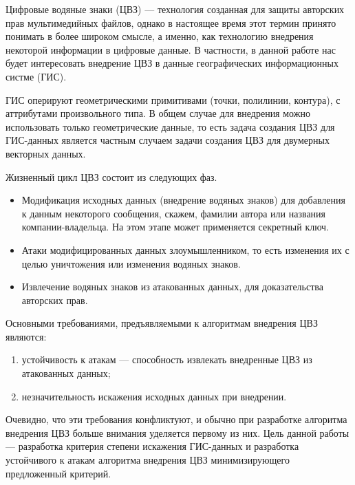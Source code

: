 \startprefacepage

Цифровые водяные знаки (ЦВЗ) --- технология созданная для защиты авторских прав мультимедийных файлов,
однако в настоящее время этот термин принято понимать в более широком смысле, а именно, как технологию
внедрения некоторой информации в цифровые данные. В частности, в данной работе нас будет интересовать
внедрение ЦВЗ в данные географических информационных систме (ГИС).

ГИС оперируют геометрическими примитивами (точки, полилинии, контура), с аттрибутами 
произвольного типа. В общем случае для внедрения можно использовать только геометрические данные,
то есть задача создания ЦВЗ для ГИС-данных является частным случаем задачи создания ЦВЗ для двумерных векторных данных.

Жизненный цикл ЦВЗ состоит из следующих фаз.
\begin{itemize}
  \item Модификация исходных данных (внедрение водяных знаков) для добавления к данным 
  некоторого сообщения, скажем, фамилии автора или названия компании-владельца. 
  На этом этапе может применяется секретный ключ. 
  \item Атаки модифицированных данных злоумышленником, то есть изменения их с целью уничтожения 
  или изменения водяных знаков.
  \item Извлечение водяных знаков из атакованных данных, для доказательства авторских прав.
\end{itemize}

Основными требованиями, предъявляемыми к алгоритмам внедрения ЦВЗ являются:
\begin{enumerate}
  \item устойчивость к атакам --- способность извлекать внедренные ЦВЗ из атакованных данных;
  \item незначительность искажения исходных данных при внедрении.
\end{enumerate}

Очевидно, что эти требования конфликтуют, и обычно при разработке алгоритма внедрения ЦВЗ
больше внимания уделяется первому из них. Цель данной работы --- разработка критерия степени искажения
ГИС-данных и разработка устойчивого к атакам алгоритма внедрения ЦВЗ
минимизирующего предложенный критерий.

